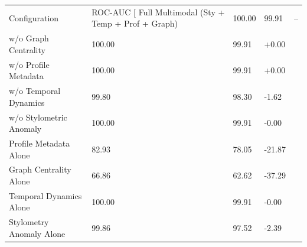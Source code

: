 \begin{tabular}{llll}
\toprule
Configuration & ROC-AUC [%
\midrule
Full Multimodal (Sty + Temp + Prof + Graph) & 100.00 & 99.91 & -- \\
w/o Graph Centrality & 100.00 & 99.91 & +0.00 \\
w/o Profile Metadata & 100.00 & 99.91 & +0.00 \\
w/o Temporal Dynamics & 99.80 & 98.30 & -1.62 \\
w/o Stylometric Anomaly & 100.00 & 99.91 & -0.00 \\
Profile Metadata Alone & 82.93 & 78.05 & -21.87 \\
Graph Centrality Alone & 66.86 & 62.62 & -37.29 \\
Temporal Dynamics Alone & 100.00 & 99.91 & -0.00 \\
Stylometry Anomaly Alone & 99.86 & 97.52 & -2.39 \\
\bottomrule
\end{tabular}
